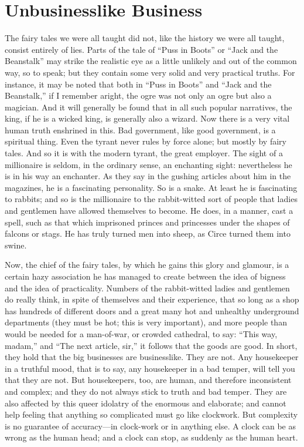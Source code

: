 \documentclass{book}
\begin{document}
\chapter{Unbusinesslike Business}
\label{chapter-2}
The fairy tales we were all taught did not, like the history we were all taught, consist entirely of lies. Parts of the tale of “Puss in Boots” or “Jack and the Beanstalk” may strike the realistic eye as a little unlikely and out of the common way, so to speak; but they contain some very solid and very practical truths. For instance, it may be noted that both in “Puss in Boots” and “Jack and the Beanstalk,” if I remember aright, the ogre was not only an ogre but also a magician. And it will generally be found that in all such popular narratives, the king, if he is a wicked king, is generally also a wizard. Now there is a very vital human truth enshrined in this. Bad government, like good government, is a spiritual thing. Even the tyrant never rules by force alone; but mostly by fairy tales. And so it is with the modern tyrant, the great employer. The sight of a millionaire is seldom, in the ordinary sense, an enchanting sight: nevertheless he is in his way an enchanter. As they say in the gushing articles about him in the magazines, he is a fascinating personality. So is a snake. At least he is fascinating to rabbits; and so is the millionaire to the rabbit-witted sort of people that ladies and gentlemen have allowed themselves to become. He does, in a manner, cast a spell, such as that which imprisoned princes and princesses under the shapes of falcons or stags. He has truly turned men into sheep, as Circe turned them into swine.

Now, the chief of the fairy tales, by which he gains this glory and glamour, is a certain hazy association he has managed to create between the idea of bigness and the idea of practicality. Numbers of the rabbit-witted ladies and gentlemen do really think, in spite of themselves and their experience, that so long as a shop has hundreds of different doors and a great many hot and unhealthy underground departments (they must be hot; this is very important), and more people than would be needed for a man-of-war, or crowded cathedral, to say: “This way, madam,” and “The next article, sir,” it follows that the goods are good. In short, they hold that the big businesses are businesslike. They are not. Any housekeeper in a truthful mood, that is to say, any housekeeper in a bad temper, will tell you that they are not. But housekeepers, too, are human, and therefore inconsistent and complex; and they do not always stick to truth and bad temper. They are also affected by this queer idolatry of the enormous and elaborate; and cannot help feeling that anything so complicated must go like clockwork. But complexity is no guarantee of accuracy—in clock-work or in anything else. A clock can be as wrong as the human head; and a clock can stop, as suddenly as the human heart.
\end{document}
